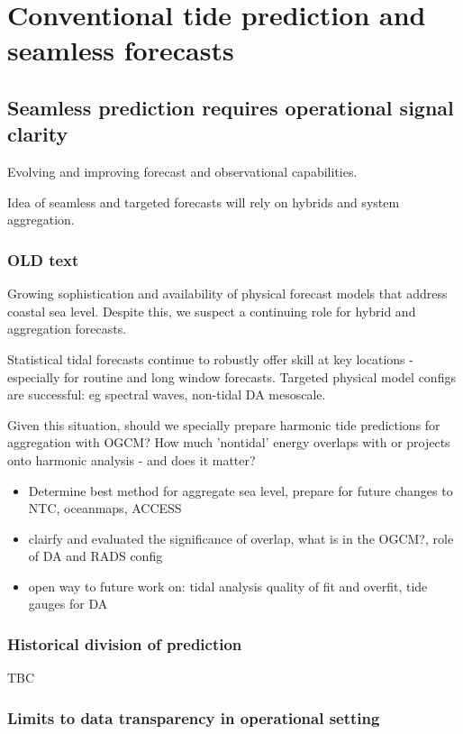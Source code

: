 \chapter{Conventional tide prediction and seamless forecasts}

\section{Seamless prediction requires operational signal clarity}

Evolving and improving forecast and observational capabilities.

Idea of seamless and targeted forecasts will rely on hybrids and system aggregation. 


\subsection{OLD text}
Growing sophistication and availability of physical forecast models that address coastal sea level. 
Despite this, we suspect a continuing role for hybrid and aggregation forecasts.


Statistical tidal forecasts continue to robustly offer skill at key locations - especially for routine and long window forecasts.
Targeted physical model configs are successful: eg spectral waves, non-tidal DA mesoscale.

Given this situation, should we specially prepare harmonic tide predictions for aggregation with OGCM?
How much 'nontidal' energy overlaps with or projects onto harmonic analysis - and does it matter?

\begin{itemize}
  \item Determine best method for aggregate sea level, prepare for future changes to NTC, oceanmaps, ACCESS
  \item clairfy and evaluated the significance of overlap, what is in the OGCM?, role of DA and RADS config
  \item open way to future work on: tidal analysis quality of fit and overfit, tide gauges for DA
\end{itemize}


\subsection{ Historical division of prediction }
TBC


\subsection{ Limits to data transparency in operational setting }


